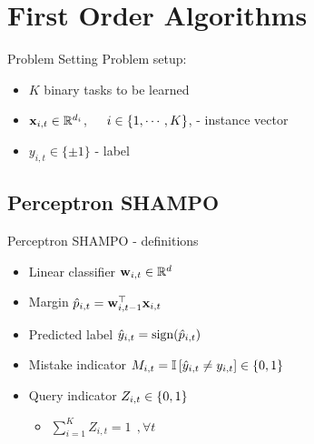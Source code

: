 \documentclass{beamer}
\begin{document}
\section{First Order Algorithms}

\begin{frame}{Problem Setting}
Problem setup:\newline
\begin{itemize}
\item $K$ binary tasks to be learned \newline
\item $\mathbf{x}_{i,t}\in \mathbb{R}^{d_i}$,~~~$i\in\left\{{1,\cdots,K}\right\}$, - instance vector\newline
\item $y_{i,t}\in\{\pm1\}$ - label\newline
\end{itemize}


\end{frame}

\subsection{Perceptron SHAMPO}

\begin{frame}{Perceptron SHAMPO  - definitions}
\begin{itemize}
\item Linear classifier $\mathbf{w}_{i,t}\in \mathbb{R}^d$ \newline
\item Margin $\hat{p}_{i,t}={\mathbf{w}}^{\top}_{i,t-1}\mathbf{x}_{i,t} $\newline
\item Predicted label $\hat{y}_{i,t}={\rm sign}(\hat{p}_{i,t})$\newline
\item Mistake indicator $M_{i,t}=\mathbb{I}\left[{\hat{y}_{i,t}\ne y_{i,t}}\right]\in\left\{{0,1}\right\}$\newline
\item Query  indicator $Z_{i,t}\in\left\{{0,1}\right\}$\newline
\begin{itemize}
\item $\sum_{i=1}^{K} Z_{i,t}=1 ~~,\forall t$\newline
\end{itemize}
\end{itemize}
\end{frame}
\end{document}
